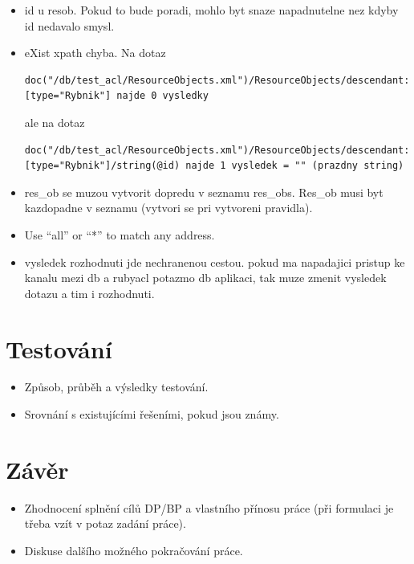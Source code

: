 \documentclass[11pt,twoside,a4paper]{book}
\begin{document}
\begin{itemize}

\item id u resob. Pokud to bude poradi, mohlo byt snaze napadnutelne nez kdyby id nedavalo smysl.

\item eXist xpath chyba. Na dotaz 
\begin{verbatim}
doc("/db/test_acl/ResourceObjects.xml")/ResourceObjects/descendant::*[type="Rybnik"] najde 0 vysledky
\end{verbatim}
ale na dotaz 
\begin{verbatim}
doc("/db/test_acl/ResourceObjects.xml")/ResourceObjects/descendant::*[type="Rybnik"]/string(@id) najde 1 vysledek = "" (prazdny string)
\end{verbatim}

\item res\_ob se muzou vytvorit dopredu v seznamu res\_obs. Res\_ob musi byt kazdopadne v seznamu (vytvori se pri vytvoreni pravidla).

\item Use “all” or “*” to match any address.

\item vysledek rozhodnuti jde nechranenou cestou. pokud ma napadajici pristup ke kanalu mezi db a rubyacl potazmo db aplikaci, tak muze zmenit vysledek dotazu a tim i rozhodnuti.

\end{itemize}
\chapter{Testování}

\begin{itemize}
 \item Způsob, průběh a výsledky testování.
 \item Srovnání s existujícími řešeními, pokud jsou známy.
\end{itemize} 


\chapter{Závěr}

\begin{itemize}
\item Zhodnocení splnění cílů DP/BP a  vlastního přínosu práce (při formulaci je třeba vzít v potaz zadání práce).
\item Diskuse dalšího možného pokračování práce.
\end{itemize} 
\end{document}
